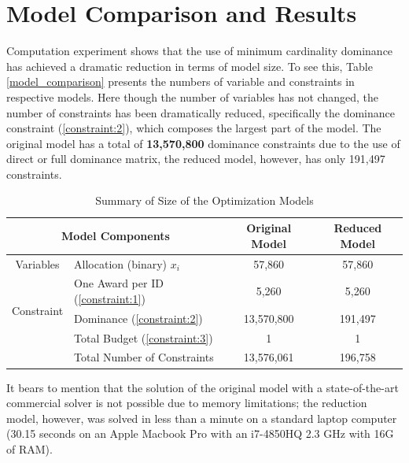 \documentclass[12pt,english]{report}
\begin{document}
\section{Model Comparison and Results}
Computation experiment shows that the use of minimum cardinality dominance has achieved a dramatic reduction in terms of model size.  To see this, Table  \ref{model_comparison} presents the numbers of variable and constraints in respective models. Here though the number of variables has not changed, the number of constraints has been dramatically reduced, specifically the dominance constraint (\ref{constraint:2}), which composes the largest part of the model.  The original model has a total of \textbf{13,570,800} dominance constraints due to the use of direct or full dominance matrix, the reduced model, however, has only 191,497 constraints. 

\begin{table}[]
\centering
\begin{tabular}{|c|l|c|c|}
\hline
\multicolumn{2}{|c|}{Model Components}                                        & Original Model & Reduced Model \\ \hline
Variables                   & \multicolumn{1}{|l|}{Allocation (binary)  $x_i$} & 57,860         & 57,860        \\ \hline
\multirow{3}{*}{Constraint} & One Award per ID  (\ref{constraint:1})        & 5,260          & 5,260         \\ \cline{2-4} 
         & Dominance  (\ref{constraint:2})               & 13,570,800     & 191,497       \\ \cline{2-4} 
         & Total Budget   (\ref{constraint:3})           & 1              & 1             \\ \cline{2-4} 
         & Total Number of Constraints                   & 13,576,061     & 196,758       \\ \hline
\end{tabular}
\caption{Summary of Size of the Optimization Models }
\label{model_comparison}
\label{size_model}
\end{table}

It bears to mention that the solution of the original model with a state-of-the-art commercial solver is not possible due to memory limitations; the reduction model, however,  was solved in less than a minute on a standard laptop computer (30.15 seconds on an Apple Macbook Pro with an i7-4850HQ 2.3 GHz with 16G of RAM).
\end{document}
